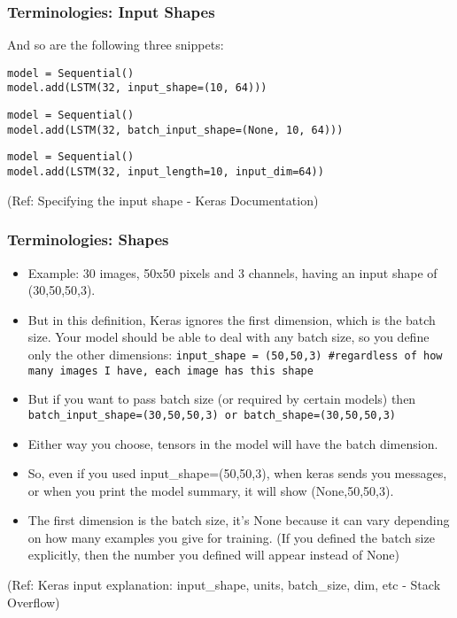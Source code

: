 \begin{frame}[fragile] \frametitle{Terminologies: Input Shapes}

And so are the following three snippets:

\begin{lstlisting}
model = Sequential()
model.add(LSTM(32, input_shape=(10, 64)))
\end{lstlisting}

\begin{lstlisting}
model = Sequential()
model.add(LSTM(32, batch_input_shape=(None, 10, 64)))
\end{lstlisting}

\begin{lstlisting}
model = Sequential()
model.add(LSTM(32, input_length=10, input_dim=64))
\end{lstlisting}

\tiny{(Ref: Specifying the input shape - Keras Documentation)}
\end{frame}


\begin{frame}[fragile] \frametitle{Terminologies: Shapes}

\begin{itemize}
\item Example: 30 images, 50x50 pixels and 3 channels, having an input shape of (30,50,50,3).
\item But in this definition, Keras ignores the first dimension, which is the batch size. Your model should be able to deal with any batch size, so you define only the other dimensions: \lstinline|input_shape = (50,50,3) #regardless of how many images I have, each image has this shape|
\item But if you want to pass batch size (or required by certain models)  then \lstinline|batch_input_shape=(30,50,50,3) or batch_shape=(30,50,50,3)|
\item Either way you choose, tensors in the model will have the batch dimension.
\item So, even if you used input\_shape=(50,50,3), when keras sends you messages, or when you print the model summary, it will show (None,50,50,3).
\item The first dimension is the batch size, it's None because it can vary depending on how many examples you give for training. (If you defined the batch size explicitly, then the number you defined will appear instead of None)
\end{itemize}

\tiny{(Ref: Keras input explanation: input\_shape, units, batch\_size, dim, etc - Stack Overflow)}
\end{frame}


